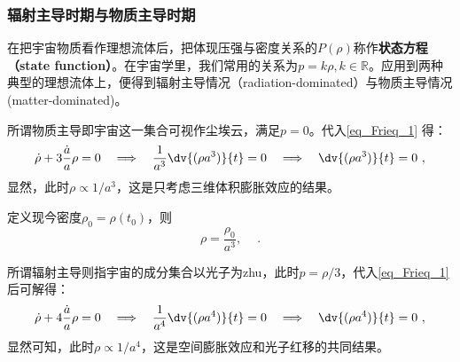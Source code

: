 \subsubsection{辐射主导时期与物质主导时期}
在把宇宙物质看作理想流体后，把体现压强与密度关系的$P(\rho)$称作\textbf{状态方程（state function）}。在宇宙学里，我们常用的关系为$p=k\rho,k\in \mathbb R$。应用到两种典型的理想流体上，便得到辐射主导情况（radiation-dominated）与物质主导情况(matter-dominated)。

所谓物质主导即宇宙这一集合可视作尘埃云，满足$p=0$。代入\autoref{eq_Frieq_1} 得：
\begin{equation}\dot{\rho}+3\frac{\dot{a}}{a}\rho=0\quad\Longrightarrow\quad\frac1{a^3}\dv{(\rho a^3)}{t}=0\quad\Longrightarrow\quad\dv{(\rho a^3)}{t}=0 ~,\end{equation}
显然，此时$\rho\propto 1/a^3$，这是只考虑三维体积膨胀效应的结果。

定义现今密度$\rho_0=\rho(t_0)$，则
\begin{equation}
\rho=\frac{\rho_0}{a^3},\quad ~.
\end{equation}

所谓辐射主导则指宇宙的成分集合以光子为zhu，此时$p=\rho/3$，代入\autoref{eq_Frieq_1} 后可解得：
\begin{equation}\dot{\rho}+4\frac{\dot{a}}{a}\rho=0\quad\Longrightarrow\quad\frac1{a^4}\dv{(\rho a^4)}{t}=0\quad\Longrightarrow\quad\dv{(\rho a^4)}{t} =0~,\end{equation}
显然可知，此时$\rho\propto  1/a^4$，这是空间膨胀效应和光子红移的共同结果。
